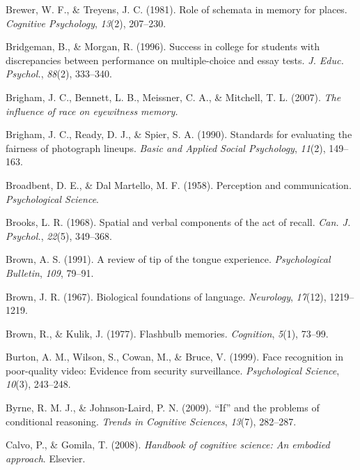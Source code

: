 \documentclass[
]{krantz}
\newlength{\cslhangindent}
\newenvironment{CSLReferences}[2] %
 {\begin{list}{}{%
  \setlength{\itemindent}{0pt}
  \setlength{\leftmargin}{0pt}
  \setlength{\parsep}{0pt}
  \ifodd #1
   \setlength{\leftmargin}{\cslhangindent}
   \setlength{\itemindent}{-1\cslhangindent}
  \fi
  \setlength{\itemsep}{#2\baselineskip}}}
 {\end{list}}
\begin{document}
\begin{CSLReferences}{1}{0}
Brewer, W. F., \& Treyens, J. C. (1981). Role of schemata in memory for places. \emph{Cognitive Psychology}, \emph{13}(2), 207--230.

Bridgeman, B., \& Morgan, R. (1996). Success in college for students with discrepancies between performance on multiple-choice and essay tests. \emph{J. Educ. Psychol.}, \emph{88}(2), 333--340.

Brigham, J. C., Bennett, L. B., Meissner, C. A., \& Mitchell, T. L. (2007). \emph{The influence of race on eyewitness memory.}

Brigham, J. C., Ready, D. J., \& Spier, S. A. (1990). Standards for evaluating the fairness of photograph lineups. \emph{Basic and Applied Social Psychology}, \emph{11}(2), 149--163.

Broadbent, D. E., \& Dal Martello, M. F. (1958). Perception and communication. \emph{Psychological Science}.

Brooks, L. R. (1968). Spatial and verbal components of the act of recall. \emph{Can. J. Psychol.}, \emph{22}(5), 349--368.

Brown, A. S. (1991). A review of tip of the tongue experience. \emph{Psychological Bulletin}, \emph{109}, 79--91.

Brown, J. R. (1967). Biological foundations of language. \emph{Neurology}, \emph{17}(12), 1219--1219.

Brown, R., \& Kulik, J. (1977). Flashbulb memories. \emph{Cognition}, \emph{5}(1), 73--99.

Burton, A. M., Wilson, S., Cowan, M., \& Bruce, V. (1999). Face recognition in poor-quality video: Evidence from security surveillance. \emph{Psychological Science}, \emph{10}(3), 243--248.

Byrne, R. M. J., \& Johnson-Laird, P. N. (2009). {``If''} and the problems of conditional reasoning. \emph{Trends in Cognitive Sciences}, \emph{13}(7), 282--287.

Calvo, P., \& Gomila, T. (2008). \emph{Handbook of cognitive science: An embodied approach}. Elsevier.


\end{CSLReferences}
\end{document}
